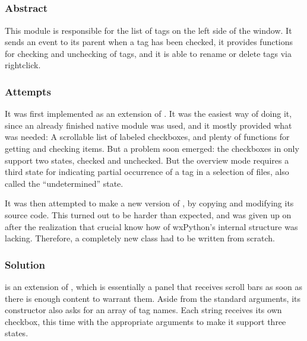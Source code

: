 \subsection{}

\subsubsection{Abstract}

This module is responsible for the list of tags on the left side of the window.
It sends an event to its parent  when a tag has been
checked, it provides functions for checking and unchecking of tags, and it is
able to rename or delete tags via rightclick.

\subsubsection{Attempts}

It was first implemented as an extension of . It was
the easiest way of doing it, since an already finished native module was used,
and it mostly provided what was needed: A scrollable list of labeled
checkboxes, and plenty of functions for getting and checking items. But a
problem soon emerged: the checkboxes in  only support
two states, checked and unchecked. But the overview mode requires a third state
for indicating partial occurrence of a tag in a selection of files, also called
the ``undetermined'' state.

It was then attempted to make a new version of , by
copying and modifying its source code. This turned out to be harder than
expected, and was given up on after the realization that crucial know how of
wxPython's internal structure was lacking. Therefore, a
completely new class had to be written from scratch.

\subsubsection{Solution}

 is an extension of , which is
essentially a panel that receives scroll bars as soon as there is enough
content to warrant them. Aside from the standard arguments, its constructor
also asks for an array of tag names. Each string receives its own checkbox,
this time with the appropriate arguments to make it support three states.

